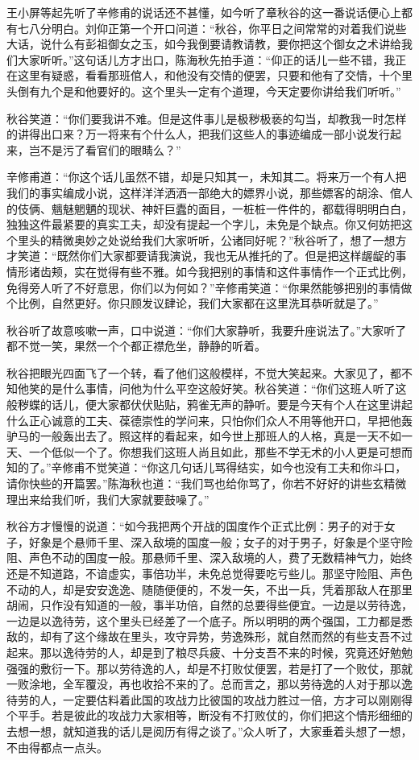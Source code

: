 \documentclass[12pt,UTF8]{ctexbook}
\begin{document}
{{{王小屏等起先听了辛修甫的说话还不甚懂，如今听了章秋谷的这一番说话便心上都有七八分明白。刘仰正第一个开口问道：“秋谷，你平日之间常常的对着我们说些大话，说什么有彭祖御女之玉，如今我倒要请教请教，要你把这个御女之术讲给我们大家听听。”这句话儿方才出口，陈海秋先拍手道：“仰正的话儿一些不错，我正在这里有疑惑，看看那班倌人，和他没有交情的便罢，只要和他有了交情，十个里头倒有九个是和他要好的。这个里头一定有个道理，今天定要你讲给我们听听。”

秋谷笑道：“你们要我讲不难。但是这件事儿是极秽极亵的勾当，却教我一时怎样的讲得出口来？万一将来有个什么人，把我们这些人的事迹编成一部小说发行起来，岂不是污了看官们的眼睛么？”

辛修甫道：“你这个话儿虽然不错，却是只知其一，未知其二。将来万一个有人把我们的事实编成小说，这样洋洋洒洒一部绝大的嫖界小说，那些嫖客的胡涂、倌人的伎俩、魑魅魍魉的现状、神奸巨蠹的面目，一桩桩一件件的，都载得明明白白，独独这件最紧要的真实工夫，却没有提起一个字儿，未免是个缺点。你又何妨把这个里头的精微奥妙之处说给我们大家听听，公诸同好呢？”秋谷听了，想了一想方才笑道：“既然你们大家都要请我演说，我也无从推托的了。但是把这样龌龊的事情形诸齿颊，实在觉得有些不雅。如今我把别的事情和这件事情作一个正式比例，免得旁人听了不好意思，你们以为何如？”辛修甫笑道：“你果然能够把别的事情做个比例，自然更好。你只顾发议肆论，我们大家都在这里洗耳恭听就是了。”

秋谷听了故意咳嗽一声，口中说道：“你们大家静听，我要升座说法了。”大家听了都不觉一笑，果然一个个都正襟危坐，静静的听着。

秋谷把眼光四面飞了一个转，看了他们这般模样，不觉大笑起来。大家见了，都不知他笑的是什么事情，问他为什么平空这般好笑。秋谷笑道：“你们这班人听了这般秽蝶的话儿，便大家都伏伏贴贴，鸦雀无声的静听。要是今天有个人在这里讲起什么正心诚意的工夫、葆德崇性的学问来，只怕你们众人不用等他开口，早把他轰驴马的一般轰出去了。照这样的看起来，如今世上那班人的人格，真是一天不如一天、一个低似一个了。你想我们这班人尚且如此，那些不学无术的小人更是可想而知的了。”辛修甫不觉笑道：“你这几句话儿骂得结实，如今也没有工夫和你斗口，请你快些的开篇罢。”陈海秋也道：“我们骂也给你骂了，你若不好好的讲些玄精微理出来给我们听，我们大家就要鼓噪了。”

秋谷方才慢慢的说道：“如今我把两个开战的国度作个正式比例：男子的对于女子，好象是个悬师千里、深入敌境的国度一般；女子的对于男子，好象是个坚守险阻、声色不动的国度一般。那悬师千里、深入敌境的人，费了无数精神气力，始终还是不知道路，不谙虚实，事倍功半，未免总觉得要吃亏些儿。那坚守险阻、声色不动的人，却是安安逸逸、随随便便的，不发一矢，不出一兵，凭着那敌人在那里胡闹，只作没有知道的一般，事半功倍，自然的总要得些便宜。一边是以劳待逸，一边是以逸待劳，这个里头已经差了一个底子。所以明明的两个强国，工力都是悉敌的，却有了这个缘故在里头，攻守异势，劳逸殊形，就自然而然的有些支吾不过起来。那以逸待劳的人，却是到了粮尽兵疲、十分支吾不来的时候，究竟还好勉勉强强的敷衍一下。那以劳待逸的人，却是不打败仗便罢，若是打了一个败仗，那就一败涂地，全军覆没，再也收拾不来的了。总而言之，那以劳待逸的人对于那以逸待劳的人，一定要估料着此国的攻战力比彼国的攻战力胜过一倍，方才可以刚刚得个平手。若是彼此的攻战力大家相等，断没有不打败仗的，你们把这个情形细细的去想一想，就知道我的话儿是阅历有得之谈了。”众人听了，大家垂着头想了一想，不由得都点一点头。

}}}
\end{document}
